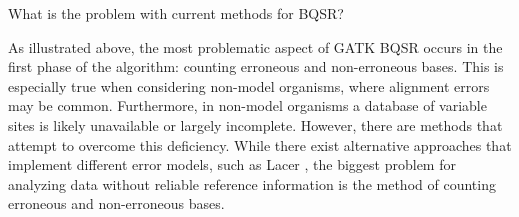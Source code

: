 \documentclass{article}
\begin{document}
\begin{outline}
	\item What is the problem with current methods for BQSR?
	\begin{outline}
		\item As illustrated above, the most problematic aspect of GATK BQSR occurs in the first phase of the algorithm: counting erroneous and non-erroneous bases. This is especially true when considering non-model organisms, where alignment errors may be common. Furthermore, in non-model organisms a database of variable sites is likely unavailable or largely incomplete. However, there are methods that attempt to overcome this deficiency. While there exist alternative approaches that implement different error models, such as Lacer \parencite{chung_lacer:_2017}, the biggest problem for analyzing data without reliable reference information is the method of counting erroneous and non-erroneous bases.



\end{outline}
\end{outline}
\end{document}

